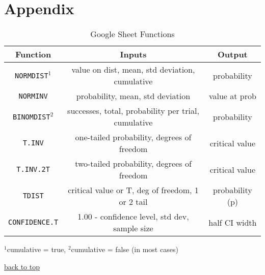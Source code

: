 \documentclass[12pt]{article}
\numberwithin{equation}{section}
\begin{document}
\section{Appendix}
\label{sec:appendix}

\begin{table}[!ht]
    \centering
    \footnotesize
    \begin{tabular}{c|c c}
        Function                &   Inputs  &   Output \\ \hline
        \verb|NORMDIST|$^1$     &   value on dist, mean, std deviation, cumulative  & probability   \\
        \verb|NORMINV|          &   probability, mean, std deviation            &   value at prob \\
        \verb|BINOMDIST|$^2$    &   successes, total, probability per trial, cumulative   &   probability \\
        \verb|T.INV|            &   one-tailed probability, degrees of freedom  &   critical value \\
        \verb|T.INV.2T|         &   two-tailed probability, degrees of freedom  &   critical value \\
        \verb|TDIST|            &   critical value or T, deg of freedom, 1 or 2 tail    &  probability (p) \\
        \verb|CONFIDENCE.T|     &   1.00 - confidence level, std dev, sample size    &   half CI width \\
    \end{tabular}
    \label{tab:sheet_functions}
    \caption{Google Sheet Functions}
\end{table}
\footnotesize{$^1$cumulative = true, $^2$cumulative = false (in most cases)}


\normalsize
\begin{flushright} \hyperref[sec:top]{back to top} \end{flushright}
\end{document}
